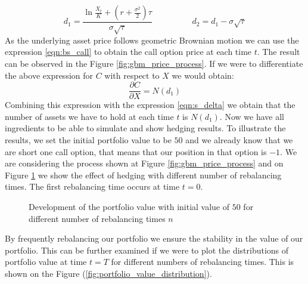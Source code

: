 \documentclass[times, utf8, diplomski]{fer}
\begin{document}
\begin{equation}
	d_1 = \frac{\ln{\frac{X_t}{K}} + \left(r + \frac{\sigma^2}{2} \right)\tau}{\sigma\sqrt{\tau}} \hspace{2cm} d_2 = d_1 - \sigma\sqrt{\tau}
\end{equation}
As the underlying asset price follows geometric Brownian motion we can use the expression \ref{eqn:bs_call} to obtain the call option price at each time $t$. The result can be observed in the Figure \ref{fig:gbm_price_process}. If we were to differentiate the above expression for $C$ with respect to $X$ we would obtain: 
\begin{equation} \label{eqn:delta_nd1}
	\frac{\partial C}{\partial X} = N(d_1)
\end{equation}
Combining this expression with the expression \ref{eqn:s_delta} we obtain that the number of assets we have to hold at each time $t$ is $N(d_1)$. Now we have all ingredients to be able to simulate and show hedging results. To illustrate the results, we set the initial portfolio value to be $50$ and we already know that we are short one call option, that means that our position in that option is $-1$. We are considering the process shown at Figure \ref{fig:gbm_price_process} and on Figure \ref{fig:hedging_gbm} we show the effect of hedging with different number of rebalancing times. The first rebalancing time occurs at time $t=0$. 

\begin{figure}[ht]
\centering

\caption{Development of the portfolio value with initial value of $50$ for different number of rebalancing times $n$}
\label{fig:hedging_gbm}	
\end{figure}
By frequently rebalancing our portfolio we ensure the stability in the value of our portfolio. This can be further examined if we were to plot the distributions of portfolio value at time $t=T$ for different numbers of rebalancing times. This is shown on the Figure (\ref{fig:portfolio_value_distribution}).
\end{document}
